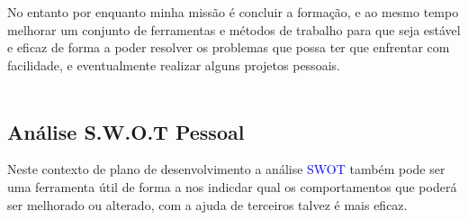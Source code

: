 \\
\\
No entanto por enquanto minha missão é concluir a formação, e ao mesmo tempo melhorar um conjunto de ferramentas e métodos de trabalho para que seja estável e eficaz de forma a poder resolver os problemas que possa ter que enfrentar com facilidade, e eventualmente realizar alguns projetos pessoais. \\
\\
\newpage
\subsection{Análise S.W.O.T Pessoal}
\qquad Neste contexto de plano de desenvolvimento a análise \textcolor{blue}{SWOT} também pode ser uma ferramenta útil de forma a nos indicdar qual os comportamentos que poderá ser melhorado ou alterado, com a ajuda de terceiros talvez é mais eficaz. \\

